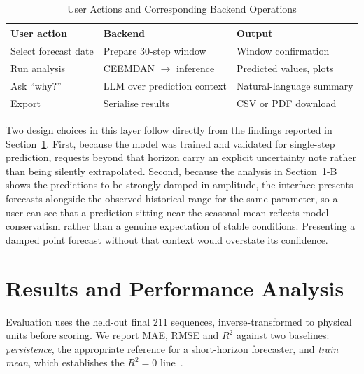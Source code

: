 \documentclass[conference]{IEEEtran}
\begin{document}
\begin{table}[!t]
\caption{User Actions and Corresponding Backend Operations}
\label{tab:ui}
\centering
\small
\setlength{\tabcolsep}{3pt}
\begin{tabular}{L{1.75cm}L{2.2cm}L{3.0cm}}
\toprule
\textbf{User action} & \textbf{Backend} & \textbf{Output} \\
\midrule
Select forecast date & Prepare 30-step window & Window confirmation \\
Run analysis & CEEMDAN $\rightarrow$ inference & Predicted values, plots \\
Ask ``why?'' & LLM over prediction context & Natural-language summary \\
Export & Serialise results & CSV or PDF download \\
\bottomrule
\end{tabular}
\end{table}

Two design choices in this layer follow directly from the findings reported in
Section~\ref{sec:results}. First, because the model was trained and validated
for single-step prediction, requests beyond that horizon carry an explicit
uncertainty note rather than being silently extrapolated. Second, because the
analysis in Section~\ref{sec:results}-B shows the predictions to be strongly
damped in amplitude, the interface presents forecasts alongside the observed
historical range for the same parameter, so a user can see that a prediction
sitting near the seasonal mean reflects model conservatism rather than a
genuine expectation of stable conditions. Presenting a damped point forecast
without that context would overstate its confidence.

\section{Results and Performance Analysis}
\label{sec:results}

Evaluation uses the held-out final 211 sequences, inverse-transformed to
physical units before scoring. We report MAE, RMSE and $R^2$ against two
baselines: \emph{persistence}, the appropriate reference for a short-horizon
forecaster, and \emph{train mean}, which establishes the $R^2=0$
line~\cite{hyndman}.
\end{document}
